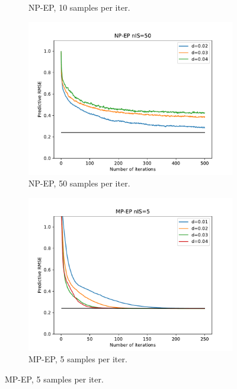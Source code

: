\begin{landscape}
\begin{figure}[ht]
\begin{subfigure}[b]{0.45\textwidth}
		\caption{NP-EP, 10 samples per iter.}
		\label{res-npep-10}
	\end{subfigure}
	\begin{subfigure}[b]{0.45\textwidth}
		\includegraphics[width=\textwidth]{figures/snep/rms-npep-nis50}
		\caption{NP-EP, 50 samples per iter.}
		\label{res-npep-50}
	\end{subfigure}
%	
	\begin{subfigure}[b]{0.45\textwidth}
		\includegraphics[width=\textwidth]{figures/snep/rms-mpep-nis05}
		\caption{MP-EP, 5 samples per iter.}
		\label{res-mpep-5}
	\end{subfigure}

\end{figure}
\end{landscape}
